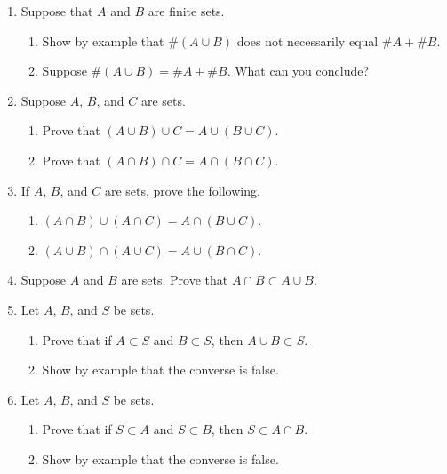 \begin{enumerate}
    \item Suppose that $A$ and $B$ are finite sets.
  \begin{enumerate}
      \item Show by example that $\# (A \cup B)$ does not necessarily equal $\# A + \# B$.
      \item Suppose $\# (A \cup B) = \# A + \# B$. What can you conclude?
  \end{enumerate}

    \item Suppose $A$, $B$, and $C$ are sets.
  \begin{enumerate}
      \item Prove that $(A \cup B) \cup C = A \cup (B \cup C)$.
      \item Prove that $(A \cap B) \cap C = A \cap (B \cap C)$.
  \end{enumerate}

    \item If $A$, $B$, and $C$ are sets, prove the following.
  \begin{enumerate}
      \item $(A \cap B) \cup (A \cap C) = A \cap (B \cup C)$.
      \item $(A \cup B) \cap (A \cup C) = A \cup (B \cap C)$.
  \end{enumerate}

    \item Suppose $A$ and $B$ are sets. Prove that $A \cap B \subset A \cup B$.

    \item Let $A$, $B$, and $S$ be sets.
  \begin{enumerate}
      \item Prove that if $A \subset S$ and $B \subset S$, then $A \cup B \subset S$.
      \item Show by example that the converse is false.
  \end{enumerate}


    \item Let $A$, $B$, and $S$ be sets.
  \begin{enumerate}
      \item Prove that if $S \subset A$ and $S \subset B$, then $S \subset A \cap B$.
      \item Show by example that the converse is false.
  \end{enumerate}



\end{enumerate}

